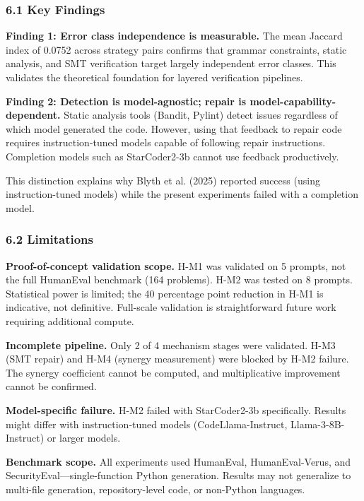 
\subsubsection{6.1 Key Findings}

\textbf{Finding 1: Error class independence is measurable.} The mean Jaccard index of 0.0752 across strategy pairs confirms that grammar constraints, static analysis, and SMT verification target largely independent error classes. This validates the theoretical foundation for layered verification pipelines.

\textbf{Finding 2: Detection is model-agnostic; repair is model-capability-dependent.} Static analysis tools (Bandit, Pylint) detect issues regardless of which model generated the code. However, using that feedback to repair code requires instruction-tuned models capable of following repair instructions. Completion models such as StarCoder2-3b cannot use feedback productively.

This distinction explains why Blyth et al. (2025) reported success (using instruction-tuned models) while the present experiments failed with a completion model.

\subsubsection{6.2 Limitations}

\textbf{Proof-of-concept validation scope.} H-M1 was validated on 5 prompts, not the full HumanEval benchmark (164 problems). H-M2 was tested on 8 prompts. Statistical power is limited; the 40 percentage point reduction in H-M1 is indicative, not definitive. Full-scale validation is straightforward future work requiring additional compute.

\textbf{Incomplete pipeline.} Only 2 of 4 mechanism stages were validated. H-M3 (SMT repair) and H-M4 (synergy measurement) were blocked by H-M2 failure. The synergy coefficient cannot be computed, and multiplicative improvement cannot be confirmed.

\textbf{Model-specific failure.} H-M2 failed with StarCoder2-3b specifically. Results might differ with instruction-tuned models (CodeLlama-Instruct, Llama-3-8B-Instruct) or larger models.

\textbf{Benchmark scope.} All experiments used HumanEval, HumanEval-Verus, and SecurityEval---single-function Python generation. Results may not generalize to multi-file generation, repository-level code, or non-Python languages.

